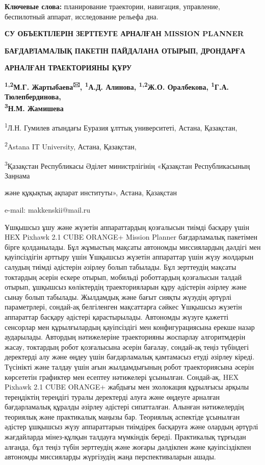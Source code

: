 {\bfseries Ключевые слова:} планирование траектории, навигация, управление,
беспилотный аппарат, исследование рельефа дна.

{\bfseries СУ ОБЪЕКТІЛЕРІН ЗЕРТТЕУГЕ АРНАЛҒАН MISSION PLANNER}

{\bfseries БАҒДАРЛАМАЛЫҚ ПАКЕТІН ПАЙДАЛАНА ОТЫРЫП, ДРОНДАРҒА}

{\bfseries АРНАЛҒАН ТРАЕКТОРИЯНЫ ҚҰРУ}

{\bfseries \textsuperscript{1,2}М.Г. Жартыбаева\textsuperscript{🖂},
\textsuperscript{1}А.Д. Алинова, \textsuperscript{1,2}Ж.О. Оралбекова,
\textsuperscript{1}Г.А. Тюлепбердинова,\\
\textsuperscript{3}Н.М. Жамишева}

\textsuperscript{1}Л.Н. Гумилев атындағы Еуразия ұлттық университеті,
Астана, Қазақстан,

\textsuperscript{2}Astana IT University, Астана, Қазақстан,

\textsuperscript{3}Қазақстан Республикасы Әділет министрлігінің
«Қазақстан Республикасының Заңнама

және құқықтық ақпарат институты», Астана, Қазақстан

e-mail: makkenskii@mail.ru

Ұшқышсыз ұшу және жүзетін аппараттардың қозғалысын тиімді басқару үшін
HEX Pixhawk 2.1 CUBE ORANGE+ Mission Planner бағдарламалық пакетімен
бірге қолданылады. Бұл жұмыстың мақсаты автономды миссиялардың дәлдігі
мен қауіпсіздігін арттыру үшін Ұшқышсыз жүзетін аппараттар үшін жүзу
жолдарын салудың тиімді әдістерін әзірлеу болып табылады. Бұл зерттеудің
мақсаты токтардың әсерін ескере отырып, мобильді роботтардың қозғалысын
талдай отырып, ұшқышсыз көліктердің траекторияларын құру әдістерін
әзірлеу және сынау болып табылады. Жылдамдық және бағыт сияқты жүзудің
әртүрлі параметрлері, сондай-ақ белгіленген мақсаттарға сәйкес Ұшқышсыз
жүзетін аппараттар басқару әдістері қарастырылады. Автономды жүзуге
қажетті сенсорлар мен құрылғылардың қауіпсіздігі мен конфигурациясына
ерекше назар аударылады. Автордың нәтижелеріне траекторияны жоспарлау
алгоритмдерін жасау, токтардың робот қозғалысына әсерін бағалау,
сондай-ақ теңіз түбіндегі деректерді алу және өңдеу үшін бағдарламалық
қамтамасыз етуді әзірлеу кіреді. Түсінікті және талдау үшін ағын
жылдамдығының робот траекториясына әсерін көрсететін графиктер мен
есептеу нәтижелері ұсынылған. Сондай-ақ, HEX Pixhawk 2.1 CUBE ORANGE+
жабдығы мен эхолокация құрылғысы арқылы тереңдіктің тереңдігі туралы
деректерді алуға және өңдеуге арналған бағдарламалық құралды әзірлеу
әдістері сипатталған. Алынған нәтижелердің теориялық және практикалық
маңызы бар. Теориялық аспектіде ұсынылған әдістер ұшқышсыз жүзу
аппараттарын тиімдірек басқаруға және олардың әртүрлі жағдайларда
мінез-құлқын талдауға мүмкіндік береді. Практикалық тұрғыдан алғанда,
бұл теңіз түбін зерттеудің және жоғары дәлдікпен және қауіпсіздікпен
автономды миссияларды жүргізудің жаңа перспективаларын ашады.

